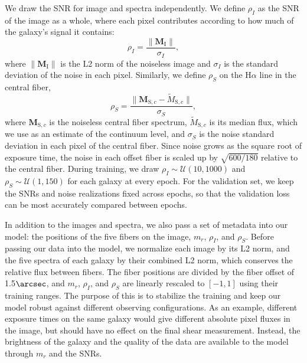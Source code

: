 We draw the SNR for image and spectra independently. We define $\rho_I$ as the SNR of the image as a whole, where each pixel contributes according to how much of the galaxy's signal it contains:
\begin{equation}
\label{eqn:snr-image}
    \rho_I = \frac{\lVert \bm{M}_\mathrm{I} \rVert}{\sigma_I},
\end{equation}
where $\lVert \bm{M}_\mathrm{I} \rVert$ is the L2 norm of the noiseless image and $\sigma_I$ is the standard deviation of the noise in each pixel. Similarly, we define $\rho_S$ on the H$\alpha$ line in the central fiber,
\begin{equation}
\label{eqn:snr-spec}
    \rho_S = \frac{\lVert \bm{M}_{\mathrm{S},c} - \tilde{M}_{\mathrm{S},c} \rVert}{\sigma_S},
\end{equation}
where $\bm{M}_{\mathrm{S},c}$ is the noiseless central fiber spectrum, $\tilde{M}_{\mathrm{S},c}$ is its median flux, which we use as an estimate of the continuum level, and $\sigma_S$ is the noise standard deviation in each pixel of the central fiber. Since noise grows as the square root of exposure time, the noise in each offset fiber is scaled up by $\sqrt{600/180}$ relative to the central fiber. During training, we draw $\rho_I \sim \mathcal{U}(10, 1000)$ and $\rho_S \sim \mathcal{U}(1, 150)$ for each galaxy at every epoch. For the validation set, we keep the SNRs and noise realizations fixed across epochs, so that the validation loss can be most accurately compared between epochs.

In addition to the images and spectra, we also pass a set of metadata into our model: the positions of the five fibers on the image, $m_r$, $\rho_I$, and $\rho_S$.  Before passing our data into the model, we normalize each image by its L2 norm, and the five spectra of each galaxy by their combined L2 norm, which conserves the relative flux between fibers. The fiber positions are divided by the fiber offset of 1.5$\arcsec$, and $m_r$, $\rho_I$, and $\rho_S$ are linearly rescaled to $[-1, 1]$ using their training ranges. The purpose of this is to stabilize the training and keep our model robust against different observing configurations. As an example, different exposure times on the same galaxy would give different absolute pixel fluxes in the image, but should have no effect on the final shear measurement. Instead, the brightness of the galaxy and the quality of the data are available to the model through $m_r$ and the SNRs.


